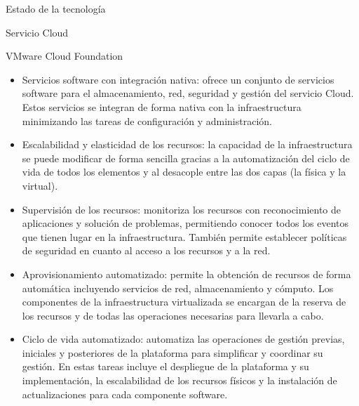 \begin{chapter}{Estado de la tecnología}
\begin{section}{Servicio Cloud}
\begin{subsection}{VMware Cloud Foundation}
    \begin{itemize}
        \item Servicios software con integración nativa: ofrece un conjunto de servicios software para el almacenamiento, red, seguridad y gestión del servicio Cloud. Estos servicios se integran de forma nativa con la infraestructura minimizando las tareas de configuración y administración.
        \item Escalabilidad y elasticidad de los recursos: la capacidad de la infraestructura se puede modificar de forma sencilla gracias a la automatización del ciclo de vida de todos los elementos y al desacople entre las dos capas (la física y la virtual).
        \item Supervisión de los recursos: monitoriza los recursos con reconocimiento de aplicaciones y solución de problemas, permitiendo conocer todos los eventos que tienen lugar en la infraestructura. También permite establecer políticas de seguridad en cuanto al acceso a los recursos y a la red.
        \item Aprovisionamiento automatizado: permite la obtención de recursos de forma automática incluyendo servicios de red, almacenamiento y cómputo. Los componentes de la infraestructura virtualizada se encargan de la reserva de los recursos y de todas las operaciones necesarias para llevarla a cabo.
    
        \item Ciclo de vida automatizado: automatiza las operaciones de gestión previas, iniciales y posteriores de la plataforma para simplificar y coordinar su gestión. En estas tareas incluye el despliegue de la plataforma y su implementación, la escalabilidad de los recursos físicos y la instalación de actualizaciones para cada componente software.
    

\end{itemize}
\end{subsection}
\end{section}
\end{chapter}
